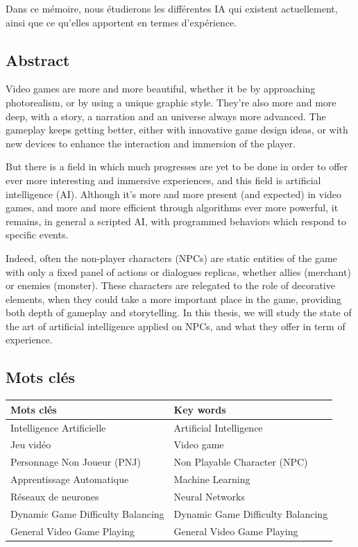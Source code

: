\documentclass[a4paper, 12pt]{article} %
\begin{document}
Dans ce mémoire, nous étudierons les différentes IA qui existent actuellement, ainsi que ce qu’elles apportent en termes d'expérience.

\newpage
\subsection{Abstract}
Video games are more and more beautiful, whether it be by approaching photorealism, or by using a unique graphic style. They’re also more and more deep, with a story, a narration and an universe always more advanced. The gameplay keeps getting better, either with innovative game design ideas, or with new devices to enhance the interaction and immersion of the player.
 
But there is a field in which much progresses are yet to be done in order to offer ever more interesting and immersive experiences, and this field is artificial intelligence (AI). Although it’s more and more present (and expected) in video games, and more and more efficient through algorithms ever more powerful, it remains, in general a scripted AI, with programmed behaviors which respond to specific events. 

Indeed, often the non-player characters (NPCs) are static entities of the game with only a fixed panel of actions or dialogues replicas, whether allies (merchant) or enemies (monster). These characters are relegated to the role of decorative elements, when they could take a more important place in the game, providing both depth of gameplay and storytelling.
In this thesis, we will study the state of the art of artificial intelligence applied on NPCs, and what they offer in term of experience.

\newpage
\subsection{Mots clés}
\begin{center}
	\begin{tabular}{|p{}|p{}|}
		\hline
		Mots clés & Key words\\
		\hline		
		Intelligence Artificielle			&Artificial Intelligence\\
		Jeu vidéo							&Video game\\
		Personnage Non Joueur (PNJ)			&Non Playable Character (NPC)\\
		Apprentissage Automatique			&Machine Learning\\
		Réseaux de neurones					&Neural Networks\\
		Dynamic Game Difficulty Balancing	&Dynamic Game Difficulty Balancing\\
		General Video Game Playing			&General Video Game Playing\\
		\hline
	\end{tabular}
\end{center}
\end{document}
